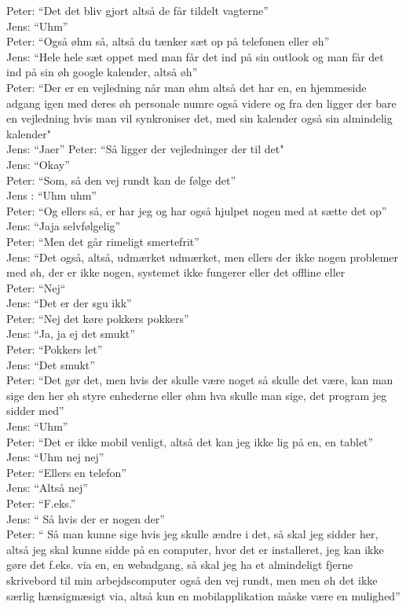 Peter: “Det det bliv gjort altså de får tildelt vagterne”\\
Jens: “Uhm”\\
Peter: “Også øhm så, altså du tænker sæt op på telefonen eller øh”\\
Jens: “Hele hele sæt oppet med man får det ind på sin outlook og man får det ind på sin øh google kalender, altså øh”\\
Peter: “Der er en vejledning når man øhm altså det har en, en hjemmeside adgang igen med deres øh personale numre også videre og fra den ligger der bare en vejledning hvis man vil synkroniser det, med sin kalender også sin almindelig kalender"\\
Jens: “Jaer”
Peter: “Så ligger der vejledninger der til det"\\
Jens: “Okay”\\
Peter: “Som, så den vej rundt kan de følge det”\\
Jens : “Uhm uhm”\\
Peter: “Og ellers så, er har jeg og har også hjulpet nogen med at sætte det op”\\
Jens: “Jaja selvfølgelig”\\
Peter: “Men det går rimeligt smertefrit”\\
Jens: “Det også, altså, udmærket udmærket, men ellers der ikke nogen problemer med øh, der er ikke nogen, systemet ikke fungerer eller det offline eller\\
Peter: “Nej“\\
Jens: “Det er der sgu ikk”\\
Peter: “Nej det køre pokkers pokkers”\\
Jens: “Ja, ja ej det smukt”\\
Peter: “Pokkers let”\\
Jens: “Det smukt”\\
Peter: “Det gør det, men hvis der skulle være noget så skulle det være, kan man sige den her øh styre enhederne eller øhm hva skulle man sige, det program jeg sidder med”\\
Jens: “Uhm”\\
Peter: “Det er ikke mobil venligt, altså det kan jeg ikke lig på en, en tablet”\\
Jens: “Uhm nej nej”\\
Peter: “Ellers en telefon”\\
Jens: “Altså nej”\\
Peter: “F.eks.”\\
Jens: “ Så hvis der er nogen der”\\
Peter: “ Så man kunne sige hvis jeg skulle ændre i det, så skal jeg sidder her, altså jeg skal kunne sidde på en computer, hvor det er installeret, jeg kan ikke gøre det f.eks. via en, en webadgang, så skal jeg ha et almindeligt fjerne skrivebord til min arbejdscomputer også den vej rundt, men men øh det ikke særlig hænsigmæsigt via, altså kun en mobilapplikation måske være en mulighed”\\
